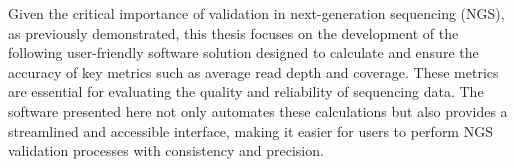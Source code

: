 Given the critical importance of validation in next-generation sequencing (NGS), as previously demonstrated, this thesis focuses on the development of the following user-friendly software solution designed to calculate and ensure the accuracy of key metrics such as average read depth and coverage. These metrics are essential for evaluating the quality and reliability of sequencing data. The software presented here not only automates these calculations but also provides a streamlined and accessible interface, making it easier for users to perform NGS validation processes with consistency and precision.



